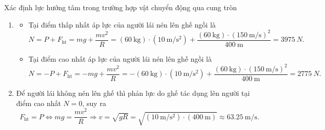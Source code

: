 \begin{dang}{Xác định lực hướng tâm trong trường hợp vật chuyển động qua cung tròn}
{{\begin{minipage}[l]{0.3\textwidth}
			\end{minipage}
			\begin{enumerate}[label=\alph*)]
				\item 
				\begin{itemize}
					\item Tại điểm thấp nhất áp lực của người lái nén lên ghế ngồi là
					\begin{equation*}
						N=P+F_{\text{ht}} = mg +\dfrac{mv^2}{R} =\left(\SI{60}{\kilogram}\right)\cdot\left(\SI{10}{\meter/\second^2}\right)+\dfrac{\left(\SI{60}{\kilogram}\right)\cdot\left(\SI{150}{\meter/\second}\right)^2}{\SI{400}{\meter}}=\SI{3975}{N}.
					\end{equation*} 
					\item Tại điểm cao nhất áp lực của người lái nén lên ghế ngồi là
					\begin{equation*}
						N=-P+F_{\text{ht}} = -mg +\dfrac{mv^2}{R} =-\left(\SI{60}{\kilogram}\right)\cdot\left(\SI{10}{\meter/\second^2}\right)+\dfrac{\left(\SI{60}{\kilogram}\right)\cdot\left(\SI{150}{\meter/\second}\right)^2}{\SI{400}{\meter}}= \SI{2775}{N}.
					\end{equation*} 
				\end{itemize}
				\item Để người lái không nén lên ghế thì phản lực do ghế tác dụng lên người tại điểm cao nhất $N=0$, suy ra 
				\begin{equation*}
					F_{\text{ht}}=P \Leftrightarrow mg = \dfrac{mv^2}{R} \Rightarrow v =\sqrt {gR} =\sqrt{\left(\SI{10}{\meter/\second^2}\right)\cdot\left(\SI{400}{\meter}\right)}\approx\SI{63.25}{\meter/\second}.
				\end{equation*}
		\end{enumerate}}
	
	}
	{}
\end{dang}
